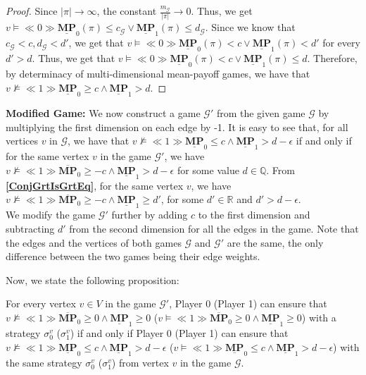 \begin{proof}
    Since $|\pi| \to \infty$, the constant $\frac{m_\mathcal{G}}{|\pi|} \to 0$. Thus, we get $v \models \ll 0 \gg \underline{\mathbf{MP}}_0(\pi) \leqslant c_\mathcal{G} \lor \underline{\mathbf{MP}}_1(\pi) \leqslant d_\mathcal{G}$. Since we know that $c_\mathcal{G} < c, d_\mathcal{G} < d'$, we get that $v \models \ll 0 \gg \underline{\mathbf{MP}}_0(\pi) < c \lor \underline{\mathbf{MP}}_1(\pi) < d'$ for every $d' > d$. Thus, we get that  $v \models \ll 0 \gg \underline{\mathbf{MP}}_0(\pi) < c \lor \underline{\mathbf{MP}}_1(\pi) \leqslant d$. Therefore, by determinacy of multi-dimensional mean-payoff games, we have that $v \nvDash \ll 1 \gg \underline{\mathbf{MP}}_0 \geqslant c \land \underline{\mathbf{MP}}_1 > d$.
\end{proof}

\textbf{Modified Game:} We now construct a game $\mathcal{G'}$ from the given game $\mathcal{G}$ by multiplying the first dimension on each edge by -1. It is easy to see that, for all vertices $v$ in $\mathcal{G}$, we have that $v \nvDash \ll 1 \gg \underline{\mathbf{MP}}_0 \leqslant c \land \underline{\mathbf{MP}}_1 > d-\epsilon$ if and only if for the same vertex $v$ in the game $\mathcal{G'}$, we have $v \nvDash \ll 1 \gg \overline{\mathbf{MP}}_0 \geqslant -c \land \underline{\mathbf{MP}}_1 > d-\epsilon$ for some value $d \in \mathbb{Q}$. From \textbf{\cref{ConjGrtIsGrtEq}}, for the same vertex $v$, we have $v \nvDash \ll 1 \gg \overline{\mathbf{MP}}_0 \geqslant -c \land \underline{\mathbf{MP}}_1 \geqslant d'$, for some $d' \in \mathbb{R}$ and $d' > d - \epsilon$. \\ \noindent
We modify the game $\mathcal{G'}$ further by adding $c$ to the first dimension and subtracting $d'$ from the second dimension for all the edges in the game. Note that the edges and the vertices of both games $\mathcal{G}$ and $\mathcal{G'}$ are the same, the only difference between the two games being their edge weights.

\noindent Now, we state the following proposition:
\begin{proposition}
    \label{PropGamStrEqNewGamStr}
    For every vertex $v \in V$ in the game $\mathcal{G'}$, Player 0 (Player 1) can ensure that $v \nvDash \ll 1 \gg \overline{\mathbf{MP}}_0 \geqslant 0 \land \underline{\mathbf{MP}}_1 \geqslant 0$ ($v \models \ll 1 \gg \overline{\mathbf{MP}}_0 \geqslant 0 \land \underline{\mathbf{MP}}_1 \geqslant 0$) with a strategy $\sigma_0^{v}$ ($\sigma_1^{v}$) if and only if Player 0 (Player 1) can ensure that $v \nvDash \ll 1 \gg \underline{\mathbf{MP}}_0 \leqslant c \land \underline{\mathbf{MP}}_1 > d-\epsilon$ ($v \models \ll 1 \gg \underline{\mathbf{MP}}_0 \leqslant c \land \underline{\mathbf{MP}}_1 > d-\epsilon$) with the same strategy $\sigma_0^{v}$ ($\sigma_1^{v}$) from vertex $v$ in the game $\mathcal{G}$.
\end{proposition}

